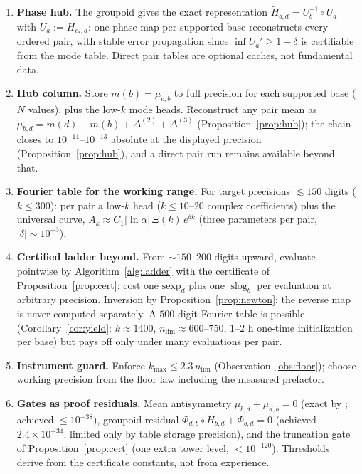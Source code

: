 \documentclass[11pt,a4paper]{article}
\theoremstyle{definition}
\theoremstyle{remark}
\newcommand{\slog}{\operatorname{slog}}
\begin{document}
\begin{enumerate}
\item \textbf{Phase hub.} The groupoid gives the exact representation
$\widetilde H_{b,d}=U_b^{-1}\circ U_d$ with $U_a:=\widetilde H_{c_*,a}$: one phase map per
supported base reconstructs every ordered pair, with stable error propagation since
$\inf U_a'\ge1-\delta$ is certifiable from the mode table. Direct pair tables are optional
caches, not fundamental data.
\item \textbf{Hub column.} Store $m(b)=\mu_{e,b}$ to full precision for each supported base
($N$ values), plus the low-$k$ mode heads. Reconstruct any pair mean as
$\mu_{b,d}=m(d)-m(b)+\Delta^{(2)}+\Delta^{(3)}$ (Proposition~\ref{prop:hub}); the chain closes to
$10^{-11}$--$10^{-13}$ absolute at the displayed precision (Proposition~\ref{prop:hub}),
and a direct pair run remains available beyond that.
\item \textbf{Fourier table for the working range.} For target precisions
$\lesssim150$ digits ($k\le300$): per pair a low-$k$ head ($k\le10$--$20$ complex
coefficients) plus the universal curve, $A_k\approx C_1\lvert\ln\alpha\rvert\,\Xi(k)\,
e^{\delta k}$ (three parameters per pair, $\lvert\delta\rvert\sim10^{-3}$).
\item \textbf{Certified ladder beyond.} From $\sim150$--$200$ digits upward, evaluate
pointwise by Algorithm~\ref{alg:ladder} with the certificate of
Proposition~\ref{prop:cert}: cost one $\mathrm{sexp}_d$ plus one $\slog_b$ per evaluation at
arbitrary precision. Inversion by Proposition~\ref{prop:newton}; the reverse map is never
computed separately. A $500$-digit Fourier table is possible
(Corollary~\ref{cor:yield}: $k\approx1400$, $n_{\mathrm{lim}}\approx600$--$750$, $1$--$2$ h
one-time initialization per base) but pays off only under many evaluations per pair.
\item \textbf{Instrument guard.} Enforce $k_{\max}\le2.3\,n_{\mathrm{lim}}$
(Observation~\ref{obs:floor}); choose working precision from the floor law including the
measured prefactor.
\item \textbf{Gates as proof residuals.} Mean antisymmetry
$\mu_{b,d}+\mu_{d,b}=0$ (exact by \cite[Thm.~B]{unified}; achieved $\le10^{-38}$), groupoid
residual $\Phi_{d,b}\circ\widetilde H_{b,d}+\Phi_{b,d}=0$ (achieved $2.4\times10^{-34}$,
limited only by table storage precision), and the truncation gate of
Proposition~\ref{prop:cert} (one extra tower level, $<10^{-120}$). Thresholds derive from the
certificate constants, not from experience.
\end{enumerate}
\end{document}
